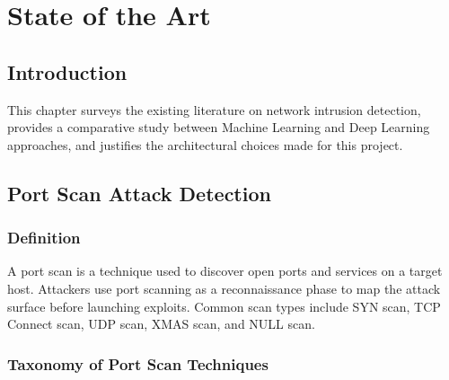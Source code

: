 
\chapter{State of the Art}

\section{Introduction}

This chapter surveys the existing literature on network intrusion detection, provides a comparative study between Machine Learning and Deep Learning approaches, and justifies the architectural choices made for this project.

\section{Port Scan Attack Detection}

\subsection{Definition}

A port scan is a technique used to discover open ports and services on a target host. Attackers use port scanning as a reconnaissance phase to map the attack surface before launching exploits. Common scan types include SYN scan, TCP Connect scan, UDP scan, XMAS scan, and NULL scan.

\subsection{Taxonomy of Port Scan Techniques}


